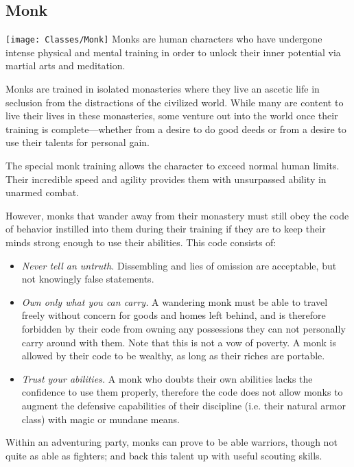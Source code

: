 \begin{multicols*}{2}

\section{Monk}\label{class:Monk}
\texttt{[image: Classes/Monk]}
Monks are human characters who have undergone intense physical and mental training in order to unlock their inner potential via martial arts and meditation.

Monks are trained in isolated monasteries where they live an ascetic life in seclusion from the distractions of the civilized world. While many are content to live their lives in these monasteries, some venture out into the world once their training is complete—whether from a desire to do good deeds or from a desire to use their talents for personal gain.

The special monk training allows the character to exceed normal human limits. Their incredible speed and agility provides them with unsurpassed ability in unarmed combat.

However, monks that wander away from their monastery must still obey the code of behavior instilled into them during their training if they are to keep their minds strong enough to use their abilities. This code consists of:

\begin{itemize}
	\item{\textit{Never tell an untruth.} Dissembling and lies of omission are acceptable, but not knowingly false statements.}
	\item{\textit{Own only what you can carry.} A wandering monk must be able to travel freely without concern for goods and homes left behind, and is therefore forbidden by their code from owning any possessions they can not personally carry around with them. Note that this is not a vow of poverty. A monk is allowed by their code to be wealthy, as long as their riches are portable.}
	\item{\textit{Trust your abilities.} A monk who doubts their own abilities lacks the confidence to use them properly, therefore the code does not allow monks to augment the defensive capabilities of their discipline (i.e. their natural armor class) with magic or mundane means.}
\end{itemize}
Within an adventuring party, monks can prove to be able warriors, though not quite as able as fighters; and back this talent up with useful scouting skills.


\end{multicols*}
